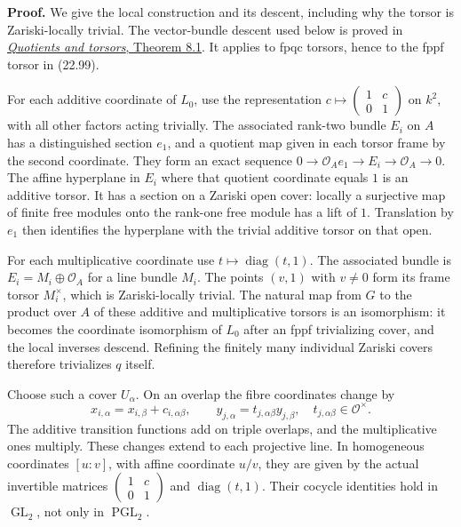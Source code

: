 \documentclass[
  11pt,
  a4paper,
]{article}
\begin{document}
\textbf{Proof.} We give the local construction and its descent,
including why the torsor is Zariski-locally trivial. The vector-bundle
descent used below is proved in
\href{https://kokunoyumeto.github.io/open-math-courses-public/courses/AG-GS/AG-GS-04.html\#8-frames-line-bundles-and-hilbert-90}{\emph{Quotients
and torsors}, Theorem 8.1}. It applies to fpqc torsors, hence to the
fppf torsor in (22.99).

For each additive coordinate of \(L_0\), use the representation
\(c\mapsto\left(\begin{smallmatrix}1&c\\0&1\end{smallmatrix}\right)\) on
\(k^2\), with all other factors acting trivially. The associated
rank-two bundle \(E_i\) on \(A\) has a distinguished section \(e_1\),
and a quotient map given in each torsor frame by the second coordinate.
They form an exact sequence
\(0\to\mathcal O_A e_1\to E_i\to\mathcal O_A\to0\). The affine
hyperplane in \(E_i\) where that quotient coordinate equals \(1\) is an
additive torsor. It has a section on a Zariski open cover: locally a
surjective map of finite free modules onto the rank-one free module has
a lift of \(1\). Translation by \(e_1\) then identifies the hyperplane
with the trivial additive torsor on that open.

For each multiplicative coordinate use
\(t\mapsto\operatorname{diag}(t,1)\). The associated bundle is
\(E_i=M_i\oplus\mathcal O_A\) for a line bundle \(M_i\). The points
\((v,1)\) with \(v\ne0\) form its frame torsor \(M_i^\times\), which is
Zariski-locally trivial. The natural map from \(G\) to the product over
\(A\) of these additive and multiplicative torsors is an isomorphism: it
becomes the coordinate isomorphism of \(L_0\) after an fppf trivializing
cover, and the local inverses descend. Refining the finitely many
individual Zariski covers therefore trivializes \(q\) itself.

Choose such a cover \(U_\alpha\). On an overlap the fibre coordinates
change by \[
 x_{i,\alpha}=x_{i,\beta}+c_{i,\alpha\beta},\qquad
 y_{j,\alpha}=t_{j,\alpha\beta}y_{j,\beta},
 \quad t_{j,\alpha\beta}\in\mathcal O^\times.
 \tag{22.100}
\] The additive transition functions add on triple overlaps, and the
multiplicative ones multiply. These changes extend to each projective
line. In homogeneous coordinates \([u:v]\), with affine coordinate
\(u/v\), they are given by the actual invertible matrices
\(\left(\begin{smallmatrix}1&c\\0&1\end{smallmatrix}\right)\) and
\(\operatorname{diag}(t,1)\). Their cocycle identities hold in
\(\operatorname{GL}_2\), not only in \(\operatorname{PGL}_2\).
\end{document}

